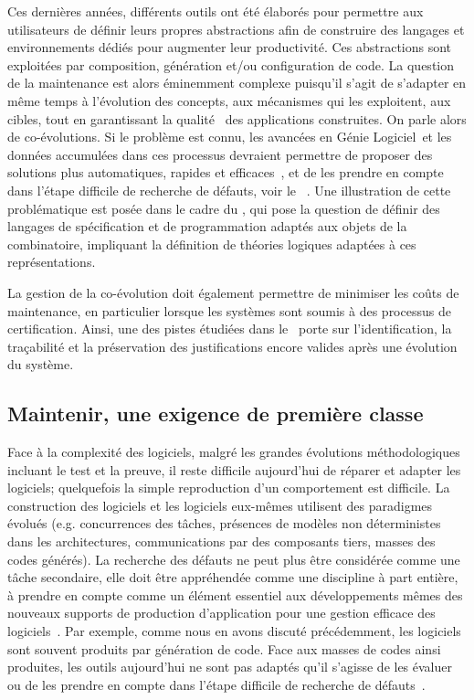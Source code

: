 \documentclass[11pt]{article}
\newcommand{\GL}[0]{Génie Logiciel\xspace}
\newcommand{\defi}[1]{\cite[défi]{#1}}
\begin{document}
Ces dernières années, différents outils ont été élaborés pour permettre aux utilisateurs de définir leurs  propres abstractions afin de construire des langages et environnements dédiés pour augmenter leur productivité. Ces abstractions sont exploitées par composition, génération et/ou configuration de code. La question de la maintenance est alors éminemment complexe puisqu'il s'agit de s'adapter en même temps à l'évolution des concepts, aux mécanismes qui les exploitent, aux cibles, tout en garantissant la \og qualité \fg~des applications construites. On parle alors de co-évolutions. Si le problème est connu, les avancées en \GL~et les données accumulées dans ces processus devraient permettre de proposer des solutions plus automatiques, rapides et efficaces~\defi{coevolution}, et de les prendre en compte dans l'étape difficile de recherche de défauts,  voir le 
~\defi{debuggers}. Une illustration de cette problématique est posée dans le cadre du \defi{combinatoire}, qui pose la question de définir des langages de spécification et de programmation adaptés aux objets de la combinatoire, impliquant la définition de théories logiques adaptées à ces représentations.


La gestion de la co-évolution doit également permettre de minimiser les coûts de maintenance, en particulier lorsque les systèmes sont soumis à des processus de certification. Ainsi, une des pistes étudiées dans le~\defi{argumentation} porte sur l'identification, la traçabilité et la préservation des justifications encore valides après une évolution du système. 



\subsection{Maintenir, une exigence de première classe \label{ss:maintenance:debugger}}
Face à la complexité des logiciels, malgré les grandes évolutions méthodologiques incluant le test et la preuve, il reste difficile aujourd'hui de réparer et adapter les logiciels; quelquefois la simple reproduction d'un comportement est difficile. 
La construction des logiciels et les 
logiciels eux-mêmes utilisent des paradigmes évolués (e.g. concurrences des tâches, présences de modèles  non déterministes dans les architectures, communications par des composants tiers, masses des codes générés). 
La  recherche des défauts ne peut plus être considérée comme une tâche secondaire, elle doit être appréhendée comme une discipline à part entière, à prendre en compte comme un élément essentiel aux développements mêmes des nouveaux supports de production d'application pour une gestion efficace des logiciels~\defi{debuggers}.
Par exemple, comme nous en avons discuté précédemment, les logiciels sont souvent produits par génération de code. Face aux masses de codes ainsi produites, les outils aujourd'hui ne sont pas adaptés qu'il s'agisse de les évaluer~\defi{coevolution} ou de les prendre en compte dans l'étape difficile de recherche de défauts~\defi{debuggers}.
\end{document}
